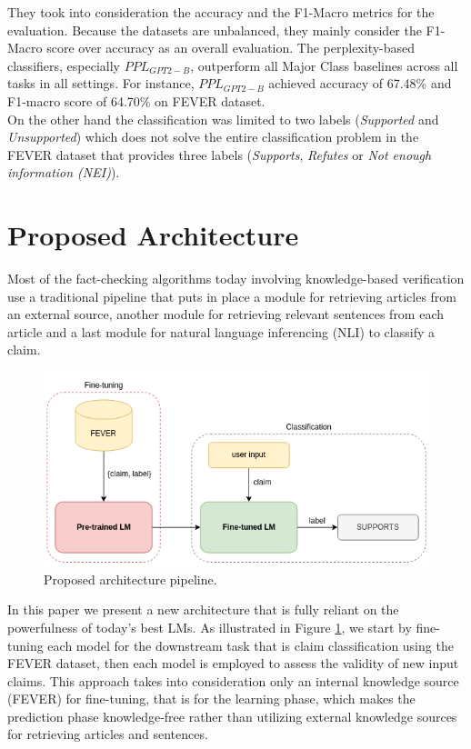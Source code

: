 \documentclass[conference]{IEEEtran}
\begin{document}
They took into consideration the accuracy and the F1-Macro metrics for the evaluation. Because the datasets are unbalanced, they mainly consider the F1-Macro score over accuracy as an overall evaluation. The perplexity-based classifiers, especially $PPL_{GPT2-B}$, outperform all Major Class baselines across all
tasks in all settings. For instance, $PPL_{GPT2-B}$ achieved accuracy of 67.48\% and F1-macro score of 64.70\% on FEVER dataset.\\
On the other hand the classification was limited to two labels (\emph{Supported} and \emph{Unsupported}) which does not solve the entire classification problem in the FEVER dataset that provides three labels (\textit{Supports}, \textit{Refutes} or \textit{Not enough information (NEI)}).

\section{Proposed Architecture}
Most of the fact-checking algorithms today involving knowledge-based verification use a traditional pipeline that puts in place a module for retrieving articles from an external source, another module for retrieving relevant sentences from each article and a last module for natural language inferencing (NLI) to classify a claim.

\begin{figure}[htp]
    \centering
    \includegraphics[scale=0.4]{processing_pipeline.png}
    \caption{Proposed architecture pipeline.}
    \label{fig:processing_pipeline}
\end{figure}


In this paper we present a new architecture that is fully reliant on the powerfulness of today's best LMs. As illustrated in Figure \ref{fig:processing_pipeline}, we start by fine-tuning each model for the downstream task that is claim classification using the FEVER dataset, then each model is employed to assess the validity of new input claims. This approach takes into consideration only an internal knowledge source (FEVER) for fine-tuning, that is for the learning phase, which makes the prediction phase knowledge-free rather than utilizing external knowledge sources for retrieving articles and sentences.
\end{document}
